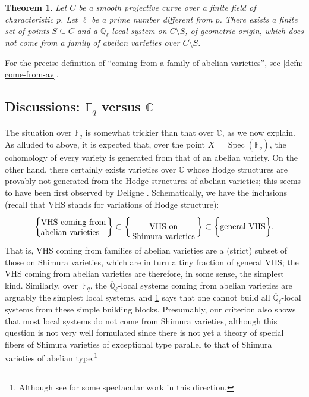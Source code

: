 \documentclass[JEP,XML,SOM,Unicode,published]{cedram}
\numberwithin{equation}{subsection}
\newtheorem{thm}{Theorem}[subsection]
\theoremstyle{definition}
\DeclareMathOperator\Spec{Spec}
\newcommand{\Qlbar}{\overline{\mathbb{Q}}_{\ell}}
\newcommand{\Q}{\mathbb Q}
\let\mb\mathbb
\begin{document}
\begin{thm}\label{thm: main-result}
Let $C$ be a smooth projective curve over a finite field of characteristic $p$. Let $\ell$ be a prime number different from $p$. There exists a finite set of points $S\subseteq C$ and a $\overline{\Q}_\ell$-local system on $C\setminus S$, of geometric origin, which does not come from a family of abelian varieties over $C\setminus S$.
\end{thm}

For the precise definition of \enquote{coming from a family of abelian varieties}, see \cref{defn: come-from-av}.

\subsection{Discussions: \texorpdfstring{$\mb{F}_q$}{Fq} versus \texorpdfstring{$\mb{C}$}{C}}
The situation over $\mb{F}_q$ is somewhat trickier than that over $\mb{C}$, as we now explain. As alluded to above, it is expected that, over the point $X=\Spec(\mb{F}_q)$, the cohomology of every variety is generated from that of an abelian variety. On the other hand, there certainly exists varieties over $\mb{C}$ whose Hodge structures are provably not generated from the Hodge structures of abelian varieties; this seems to have been first observed by Deligne \cite[\S 7.6]{Deligne-La-conjecture-de-Weil-pour-les-surfaces-K3}.
Schematically, we have the inclusions (recall that VHS stands for variations of Hodge structure):
\[
\bigg\{
\parbox{8em}{VHS coming from\\abelian varieties}
\bigg\} \subset
\bigg\{\parbox{8em}{\center VHS on \\Shimura varieties}
\bigg\} \subset
\bigg\{
\parbox{5.5em}{general VHS}
\bigg\}.
\]
That is, VHS coming from families of abelian varieties are a (strict) subset of those on Shimura varieties, which are in turn a tiny fraction of general VHS; the VHS coming from abelian varieties are therefore, in some sense, the simplest kind. Similarly, over~$\mb{F}_q$, the $\Qlbar$-local systems coming from abelian varieties are arguably the simplest local systems, and \cref{thm: main-result} says that one cannot build all $\Qlbar$-local systems from these simple building blocks. Presumably, our criterion also shows that most local systems do not come from Shimura varieties, although this question is not very well formulated since there is not yet a theory of special fibers of Shimura varieties of exceptional type parallel to that of Shimura varieties of abelian type.\footnote{Although see \cite{Bakker-Shankar-Tsimerman-Integral-Canonical-Models-of-Exceptional-Shimura-Varieties} for some spectacular work in this direction.}
\end{document}
